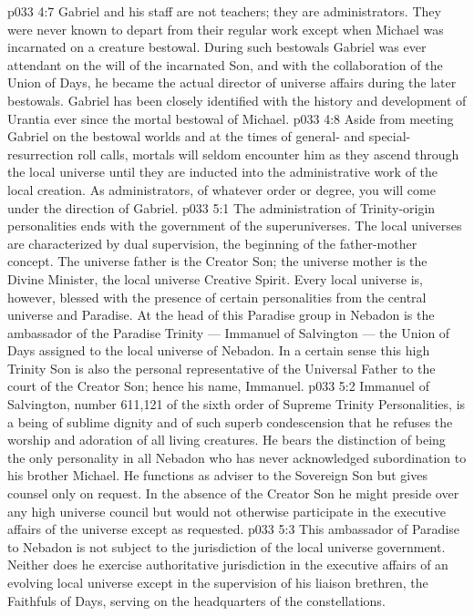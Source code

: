 \vs p033 4:7 \pc Gabriel and his staff are not teachers; they are administrators. They were never known to depart from their regular work except when Michael was incarnated on a creature bestowal. During such bestowals Gabriel was ever attendant on the will of the incarnated Son, and with the collaboration of the Union of Days, he became the actual director of universe affairs during the later bestowals. Gabriel has been closely identified with the history and development of Urantia ever since the mortal bestowal of Michael.
\vs p033 4:8 Aside from meeting Gabriel on the bestowal worlds and at the times of general\hyp{} and special\hyp{}resurrection roll calls, mortals will seldom encounter him as they ascend through the local universe until they are inducted into the administrative work of the local creation. As administrators, of whatever order or degree, you will come under the direction of Gabriel.
\vs p033 5:1 The administration of Trinity\hyp{}origin personalities ends with the government of the superuniverses. The local universes are characterized by dual supervision, the beginning of the father\hyp{}mother concept. The universe father is the Creator Son; the universe mother is the Divine Minister, the local universe Creative Spirit. Every local universe is, however, blessed with the presence of certain personalities from the central universe and Paradise. At the head of this Paradise group in Nebadon is the ambassador of the Paradise Trinity --- Immanuel of Salvington --- the Union of Days assigned to the local universe of Nebadon. In a certain sense this high Trinity Son is also the personal representative of the Universal Father to the court of the Creator Son; hence his name, Immanuel.
\vs p033 5:2 Immanuel of Salvington, number 611,121 of the sixth order of Supreme Trinity Personalities, is a being of sublime dignity and of such superb condescension that he refuses the worship and adoration of all living creatures. He bears the distinction of being the only personality in all Nebadon who has never acknowledged subordination to his brother Michael. He functions as adviser to the Sovereign Son but gives counsel only on request. In the absence of the Creator Son he might preside over any high universe council but would not otherwise participate in the executive affairs of the universe except as requested.
\vs p033 5:3 This ambassador of Paradise to Nebadon is not subject to the jurisdiction of the local universe government. Neither does he exercise authoritative jurisdiction in the executive affairs of an evolving local universe except in the supervision of his liaison brethren, the Faithfuls of Days, serving on the headquarters of the constellations.

